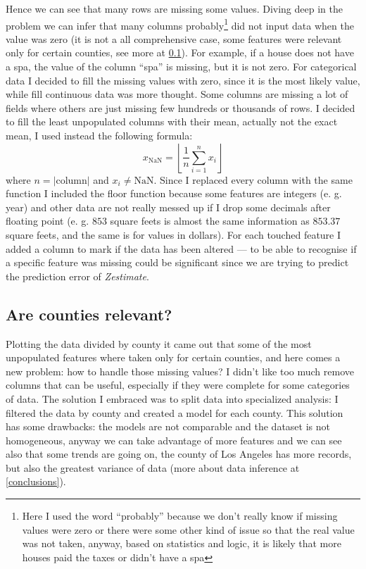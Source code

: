 Hence we can see that many rows are missing some values. Diving deep in the problem we can infer that many columns probably\footnote{Here I used the word ``probably'' because we don't really know if missing values were zero or there were some other kind of issue so that the real value was not taken, anyway, based on statistics and logic, it is likely that more houses paid the taxes or didn't have a spa} did not input data when the value was zero (it is not a all comprehensive case, some features were relevant only for certain counties, see more at \ref{counties_importance}). For example, if a house does not have a spa, the value of the column ``spa'' is missing, but it is not zero. For categorical data I decided to fill the missing values with zero, since it is the most likely value, while fill continuous data was more thought. Some columns are missing a lot of fields where others are just missing few hundreds or thousands of rows. I decided to fill the least unpopulated columns with their mean, actually not the exact mean, I used instead the following formula:
$$
    x_{\text{NaN}} = \left\lfloor \frac{1}{n} \sum_{i=1}^{n} x_i \right\rfloor
$$
where $n = |\text{column}|$ and $x_i \neq \text{NaN}$. Since I replaced every column with the same function I included the floor function because some features are integers (e. g. year) and other data are not really messed up if I drop some decimals after floating point (e. g. $853$ square feets is almost the same information as $853.37$ square feets, and the same is for values in dollars).
For each touched feature I added a column to mark if the data has been altered --- to be able to recognise if a specific feature was missing could be significant since we are trying to predict the prediction error of \textit{Zestimate}. %

\subsection{Are counties relevant?}\label{counties_importance}

Plotting the data divided by county it came out that some of the most unpopulated features where taken only for certain counties, and here comes a new problem: how to handle those missing values? I didn't like too much remove columns that can be useful, especially if they were complete for some categories of data. The solution I embraced was to split data into specialized analysis: I filtered the data by county and created a model for each county.
This solution has some drawbacks: the models are not comparable and the dataset is not homogeneous, anyway we can take advantage of more features and we can see also that some trends are going on, the county of Los Angeles has more records, but also the greatest variance of data (more about data inference at \ref{conclusions}).
    
